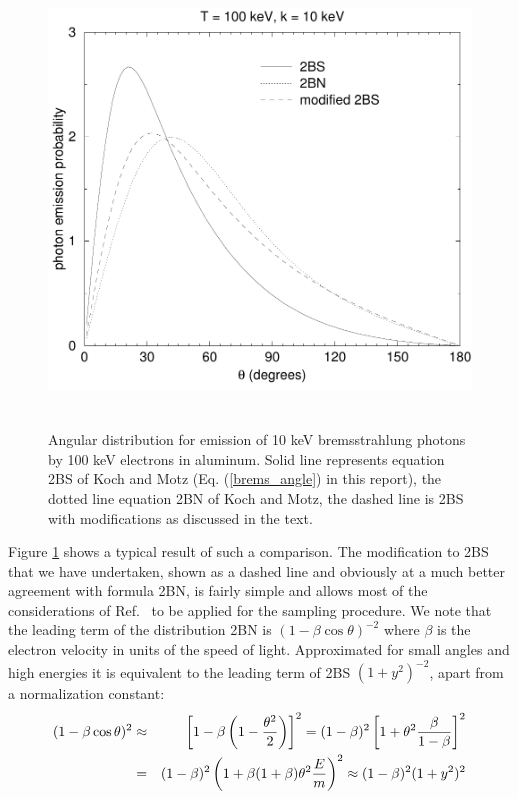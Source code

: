 \begin{figure}[htp]
\includegraphics[height=12cm,width=12cm]{figures/bremang1}
\caption[Low energy bremsstrahlung angular distribution]{\label{brems_angle_fig1} 
Angular distribution for emission of 10 keV bremsstrahlung photons 
by 100 keV electrons in aluminum. Solid line represents 
equation 2BS of Koch and Motz (Eq. (\ref{brems_angle}) in this 
report), the dotted line equation 2BN of Koch and Motz, the 
dashed line is 2BS with modifications as discussed in the text.}
\end{figure}
Figure \ref{brems_angle_fig1} shows a typical result of such 
a comparison. The modification to 2BS that we have undertaken, 
shown as a dashed line and obviously at a much better 
agreement with formula 2BN, 
is fairly simple and allows most of the considerations of 
Ref.~\cite{Bi89} to be applied for the sampling procedure. 
We note that the leading term of the distribution 
2BN is $(1 - \beta \cos \theta)^{-2}$ where $\beta$ is the 
electron velocity in units of the speed of light. 
Approximated for
small angles and high energies it is equivalent to 
the leading term of 2BS $(1 + y^2)^{-2}$, apart from a 
normalization constant:
\begin{eqnarray}
(1 - \beta \cos \theta)^2 & \approx &
\left[1 - \beta\left(1 - \frac{\theta^2}{2}\right)\right]^2 = 
(1 - \beta)^2 \left[ 1 + \theta^2 {\beta \over 1 - \beta} \right]^2 
\nonumber \\ 
& = & (1 - \beta)^2 \left(1 + \beta (1 + \beta) \theta^2 \frac{E}{m} \right)^2 
\approx (1 - \beta)^2 (1 + y^2)^2
\end{eqnarray}
